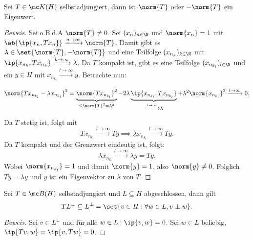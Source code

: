 \begin{theorem}
	\label{operatornorm_ev}
	Sei $T \in \mc K(H)$ selbstadjungiert, dann ist $\norm{T}$ oder $-\norm{T}$ ein Eigenwert.
	
	\begin{proof}[Beweis]
		
		Sei o.B.d.A $\norm{T} \not= 0$. Sei $(x_n)_{n \in \N}$ und $\norm{x_n} = 1$ mit $\ab{\ip{x_n, Tx_n}} \xrightarrow{n \to \infty} \norm{T}$. Damit gibt es $\lambda \in \set{\norm{T}, -\norm{T}}$ und eine Teilfolge $(x_{n_k})_{k \in \N}$ mit $\ip{x_{n_k}, Tx_{n_k}} \xrightarrow{k \to \infty} \lambda$. Da $T$ kompakt ist, gibt es eine Teilfolge $(x_{n_{k_l}})_{l \in \N}$ und ein $y \in H$ mit $x_{n_{k_l}} \xrightarrow{l \to \infty} y$. Betrachte nun:
		
		\[ \norm{Tx_{n_{k_l}} - \lambda x_{n_{k_l}}}^2 = \underbrace{\norm{T x_{n_{k_l}}}^2}_{\leq \norm{T}^2 = \lambda^2} - 2 \lambda \underbrace{\ip{x_{n_{k_l}}, T x_{n_{k_l}}}}_{\xrightarrow{l \to \infty} \lambda} + \lambda^2 \norm{x_{n_{k_l}}}^2 \xrightarrow{l \to \infty} 0. \]
		
		
		Da $T$ stetig ist, folgt mit \[T x_{n_{k_l}} \xrightarrow{l \to \infty} Ty \implies \lambda x_{n_{k_l}} \xrightarrow{l \to \infty} Ty.\] Da $T$ kompakt und der Grenzwert eindeutig ist, folgt: \[\lambda x_{n_{k_l}} \xrightarrow{l \to \infty} \lambda y = Ty.\] Wobei $\norm{x_{n_{k_l}}} = 1$ und damit $\norm{y} = 1$, also $\norm{y} \not= 0$. Folglich $Ty = \lambda y$ und $y$ ist ein Eigenvektor zu $\lambda$ von $T$.
		
	\end{proof}
	
\end{theorem}


\begin{theorem}
	
	Sei $T \in \mc B(H)$ selbstadjungiert und $L \subseteq H$ abgeschlossen, dann gilt \[TL^{\perp} \subseteq L^{\perp} = \set{v \in H: \forall w \in L, v \perp w}.\]
	
	\begin{proof}[Beweis]
		
		Sei $v \in L^{\perp}$ und für alle $w \in L: \ip{v, w} = 0$. Sei $w \in L$ beliebig, $\ip{Tv, w} = \ip{v, Tw} = 0$.
		
	\end{proof}
	
\end{theorem}